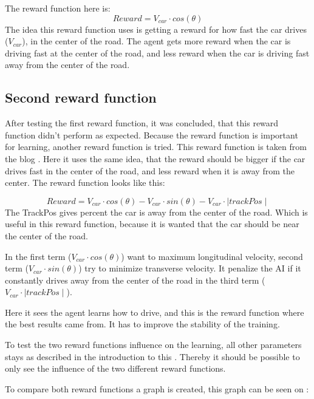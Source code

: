 The reward function here is:
\begin{equation}
Reward = V_{car} \cdot cos(\theta) 
\end{equation}
The idea this reward function uses is getting a reward for how fast the car drives ($V_{car}$), in the center of the road. The agent gets more reward when the car is driving fast at the center of the road, and less reward when the car is driving fast away from the center of the road. 

\subsection*{Second reward function}
After testing the first reward function, it was concluded, that this reward function didn't perform as expected. Because the reward function is important for learning, another reward function is tried. This reward function is taken from the blog \cite{DDPG_Torcs}. Here it uses the same idea, that the reward should be bigger if the car drives fast in the center of the road, and less reward when it is away from the center. The reward function looks like this:

\begin{equation}
\label{eq:reward_2}
Reward = V_{car} \cdot cos(\theta) - V_{car} \cdot sin(\theta) - V_{car} \cdot \mid trackPos\mid 
\end{equation}
The TrackPos gives percent the car is away from the center of the road. Which is useful in this reward function, because it is wanted that the car should be near the center of the road.  

In  the first term ($V_{car} \cdot cos(\theta)$) want to maximum longitudinal velocity, second term ($V_{car} \cdot sin(\theta)$) try to minimize transverse velocity. It penalize the AI if it constantly drives away from the center of the road in the third term ($V_{car} \cdot \mid trackPos\mid$).

Here it sees the agent learns how to drive, and this is the reward function where the best results came from. It has to improve the stability of the training. 

To test the two reward functions influence on the learning, all other parameters stays as described in the introduction to this . Thereby it should be possible to only see the influence of the two different reward functions. 

To compare both reward functions a graph is created, this graph can be seen on :

